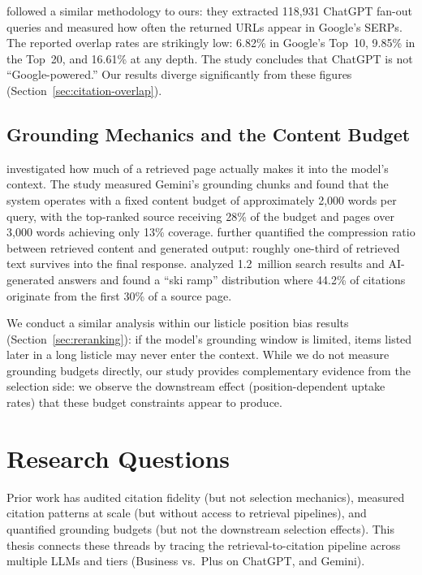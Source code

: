 \textcite{ong2025chatgptgoogle} followed a similar methodology to ours: they extracted 118,931 ChatGPT fan-out queries and measured how often the returned URLs appear in Google's SERPs. The reported overlap rates are strikingly low: 6.82\% in Google's Top~10, 9.85\% in the Top~20, and 16.61\% at any depth. The study concludes that ChatGPT is not ``Google-powered.'' Our results diverge significantly from these figures (Section~\ref{sec:citation-overlap}).

\subsection{Grounding Mechanics and the Content Budget}
\label{sec:rw-grounding-mechanics}

\textcite{petrovic2025grounding} investigated how much of a retrieved page actually makes it into the model's context. The study measured Gemini's grounding chunks and found that the system operates with a fixed content budget of approximately 2,000 words per query, with the top-ranked source receiving 28\% of the budget and pages over 3,000 words achieving only 13\% coverage. \textcite{petrovic2025filter} further quantified the compression ratio between retrieved content and generated output: roughly one-third of retrieved text survives into the final response. \textcite{indig2026attention} analyzed 1.2~million search results and AI-generated answers and found a ``ski ramp'' distribution where 44.2\% of citations originate from the first 30\% of a source page. 

We conduct a similar analysis within our listicle position bias results (Section~\ref{sec:reranking}): if the model's grounding window is limited, items listed later in a long listicle may never enter the context. While we do not measure grounding budgets directly, our study provides complementary evidence from the selection side: we observe the downstream effect (position-dependent uptake rates) that these budget constraints appear to produce.

\section{Research Questions}
\label{sec:research-questions}

Prior work has audited citation fidelity (but not selection mechanics), measured citation patterns at scale (but without access to retrieval pipelines), and quantified grounding budgets (but not the downstream selection effects). This thesis connects these threads by tracing the retrieval-to-citation pipeline across multiple LLMs and tiers (Business vs.\ Plus on ChatGPT, and Gemini).

